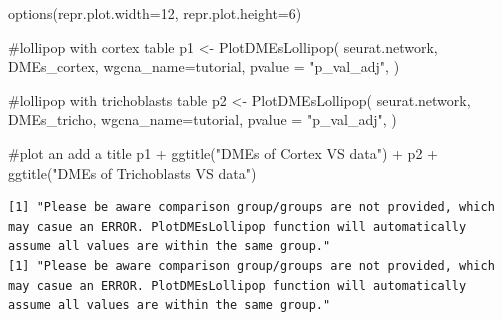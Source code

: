 \documentclass[
  letterpaper,
  DIV=11,
  numbers=noendperiod]{scrartcl}
\newenvironment{Shaded}{\begin{snugshade}}{\end{snugshade}}
\newcommand{\AttributeTok}[1]{\textcolor[rgb]{0.40,0.45,0.13}{#1}}
\newcommand{\CommentTok}[1]{\textcolor[rgb]{0.37,0.37,0.37}{#1}}
\newcommand{\DecValTok}[1]{\textcolor[rgb]{0.68,0.00,0.00}{#1}}
\newcommand{\FunctionTok}[1]{\textcolor[rgb]{0.28,0.35,0.67}{#1}}
\newcommand{\NormalTok}[1]{\textcolor[rgb]{0.00,0.23,0.31}{#1}}
\newcommand{\OtherTok}[1]{\textcolor[rgb]{0.00,0.23,0.31}{#1}}
\newcommand{\SpecialCharTok}[1]{\textcolor[rgb]{0.37,0.37,0.37}{#1}}
\newcommand{\StringTok}[1]{\textcolor[rgb]{0.13,0.47,0.30}{#1}}
\begin{document}
\begin{Shaded}
\begin{Highlighting}[]
\FunctionTok{options}\NormalTok{(}\AttributeTok{repr.plot.width=}\DecValTok{12}\NormalTok{, }\AttributeTok{repr.plot.height=}\DecValTok{6}\NormalTok{)}

\CommentTok{\#lollipop with cortex table}
\NormalTok{p1 }\OtherTok{\textless{}{-}} \FunctionTok{PlotDMEsLollipop}\NormalTok{(}
\NormalTok{  seurat.network, }
\NormalTok{  DMEs\_cortex, }
  \AttributeTok{wgcna\_name=}\StringTok{\textquotesingle{}tutorial\textquotesingle{}}\NormalTok{, }
  \AttributeTok{pvalue =} \StringTok{"p\_val\_adj"}\NormalTok{,}
\NormalTok{)}

\CommentTok{\#lollipop with trichoblasts table}
\NormalTok{p2 }\OtherTok{\textless{}{-}} \FunctionTok{PlotDMEsLollipop}\NormalTok{(}
\NormalTok{  seurat.network, }
\NormalTok{  DMEs\_tricho, }
  \AttributeTok{wgcna\_name=}\StringTok{\textquotesingle{}tutorial\textquotesingle{}}\NormalTok{, }
  \AttributeTok{pvalue =} \StringTok{"p\_val\_adj"}\NormalTok{,}
\NormalTok{)}

\CommentTok{\#plot an add a title}
\NormalTok{p1 }\SpecialCharTok{+} \FunctionTok{ggtitle}\NormalTok{(}\StringTok{"DMEs of Cortex VS data"}\NormalTok{) }\SpecialCharTok{+} 
\NormalTok{p2 }\SpecialCharTok{+} \FunctionTok{ggtitle}\NormalTok{(}\StringTok{"DMEs of Trichoblasts VS data"}\NormalTok{)}
\end{Highlighting}
\end{Shaded}

\begin{verbatim}
[1] "Please be aware comparison group/groups are not provided, which may casue an ERROR. PlotDMEsLollipop function will automatically assume all values are within the same group."
[1] "Please be aware comparison group/groups are not provided, which may casue an ERROR. PlotDMEsLollipop function will automatically assume all values are within the same group."
\end{verbatim}
\end{document}
